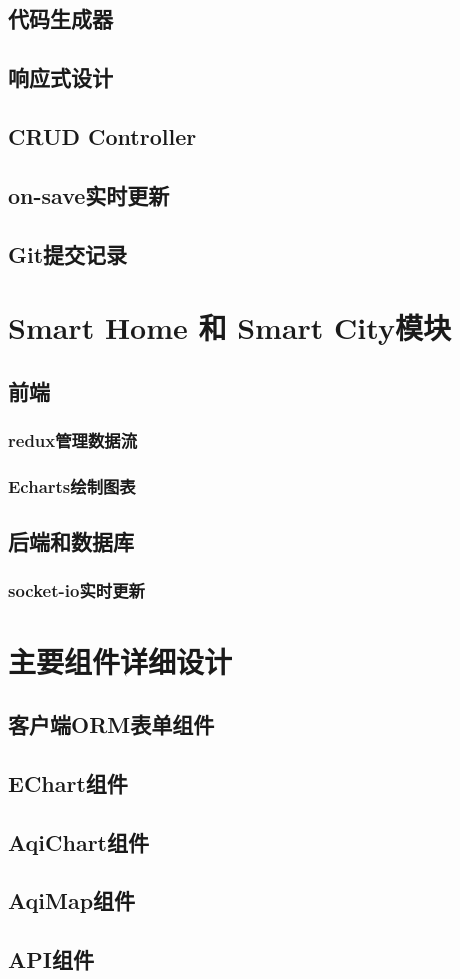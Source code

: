 \subsection{代码生成器}
\subsection{响应式设计}
\subsection{CRUD Controller}
\subsection{on-save实时更新}
\subsection{Git提交记录}
\section{Smart Home 和 Smart City模块}
\subsection{前端}
\subsubsection{redux管理数据流}
\subsubsection{Echarts绘制图表}
\subsection{后端和数据库}
\subsubsection{socket-io实时更新}
\section{主要组件详细设计}
\subsection{客户端ORM表单组件}
\subsection{EChart组件}
\subsection{AqiChart组件}
\subsection{AqiMap组件}
\subsection{API组件}
